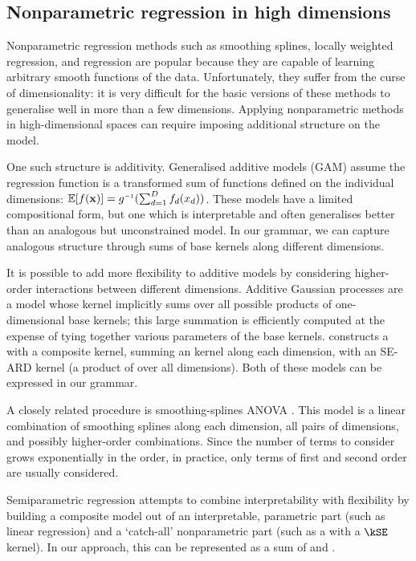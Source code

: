 \subsection{Nonparametric regression in high dimensions}
Nonparametric regression methods such as smoothing splines, locally weighted regression, and \gp{} regression are popular because they are capable of learning arbitrary smooth functions of the data.
Unfortunately, they suffer from the curse of dimensionality: it is very difficult for the basic versions of these methods to generalise well in more than a few dimensions.
Applying nonparametric methods in high-dimensional spaces can require imposing additional structure on the model.

One such structure is additivity.
Generalised additive models (GAM) assume the regression function is a transformed sum of functions defined on the individual dimensions: $\expect[f(\vx)] = g\inv(\sum_{d=1}^D f_d(x_d))$.
These models have a limited compositional form, but one which is interpretable and often generalises better than an analogous but unconstrained model.
In our grammar, we can capture analogous structure through sums of base kernels along different dimensions.

It is possible to add more flexibility to additive models by considering higher-order interactions between different dimensions. 
Additive Gaussian processes \citep{Duvenaud2011-wb} are a \gp{} model whose kernel implicitly sums over all possible products of one-dimensional base kernels; this large summation is efficiently computed at the expense of tying together various parameters of the base kernels.  
\citet{Plate1999-xh} constructs a \gp{} with a composite kernel, summing an \kSE{} kernel along each dimension, with an SE-ARD kernel (\ie a product of \kSE{} over all dimensions).
Both of these models can be expressed in our grammar.

A closely related procedure is smoothing-splines ANOVA \citep{Wahba1990-ml, Gu2002-at, Wahba2004-fk}.
This model is a linear combination of smoothing splines along each dimension, all pairs of dimensions, and possibly higher-order combinations.
Since the number of terms to consider grows exponentially in the order, in practice, only terms of first and second order are usually considered.

Semiparametric regression \citep[e.g.][]{Ruppert2003-uq} attempts to combine interpretability with flexibility by building  a composite model out of an interpretable, parametric part (such as linear regression) and a `catch-all' nonparametric part (such as a \gp{} with a $\kSE$ kernel).
In our approach, this can be represented as a sum of \kSE{} and \kLin{}.

